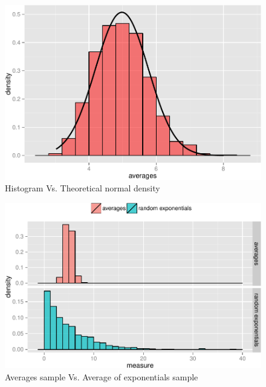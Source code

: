 \documentclass[]{article}
\begin{document}
\begin{figure}

{\centering \includegraphics[width=.7\textwidth]{Simulation_Project_files/figure-latex/histogram-1} 

}

\caption{Histogram Vs. Theoretical normal density}\label{fig:histogram}
\end{figure}

\begin{figure}

{\centering \includegraphics[width=.7\textwidth]{Simulation_Project_files/figure-latex/expcomparison-1} 

}

\caption{Averages sample Vs. Average of exponentials sample}\label{fig:expcomparison}
\end{figure}
\end{document}
